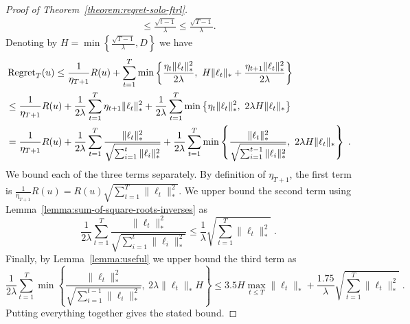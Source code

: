 \begin{proof}[Proof of Theorem~\ref{theorem:regret-solo-ftrl}]
\begin{align*}
\le \frac{\sqrt{t-1}}{\lambda}
\le \frac{\sqrt{T-1}}{\lambda}.
\end{align*}
Denoting by $H=\min\left\{\frac{\sqrt{T-1}}{\lambda},D\right\}$ we have
\begin{align*}
& \operatorname{Regret}_T(u)
\le \frac{1}{\eta_{T+1}} R(u) + \sum_{t=1}^T \min\left\{ \frac{\eta_t \|\ell_t\|_*^2}{2\lambda}, \ H \|\ell_t\|_* + \frac{\eta_{t+1} \|\ell_t\|_*^2}{2\lambda}  \right\} \\
& \le \frac{1}{\eta_{T+1}} R(u) + \frac{1}{2\lambda} \sum_{t=1}^T  \eta_{t+1} \|\ell_t\|_*^2 + \frac{1}{2\lambda} \sum_{t=1}^T \min\left\{ \eta_t \|\ell_t\|_*^2, \ 2 \lambda H \|\ell_t\|_* \right\} \\
& = \frac{1}{\eta_{T+1}} R(u) + \frac{1}{2\lambda} \sum_{t=1}^T  \frac{\|\ell_t\|_*^2}{\sqrt{\sum_{i=1}^t \|\ell_i\|_*^2}} + \frac{1}{2 \lambda} \sum_{t=1}^T \min\left\{ \frac{\|\ell_t\|_*^2}{\sqrt{\sum_{i=1}^{t-1} \|\ell_i\|_*^2}}, \ 2 \lambda H \|\ell_t\|_* \right\} \; .
\end{align*}
We bound each of the three terms separately. By definition of $\eta_{T+1}$, the
first term is $\frac{1}{\eta_{T+1}} R(u) = R(u) \sqrt{\sum_{t=1}^T
\|\ell_t\|_*^2}$.  We upper bound the second term using
Lemma~\ref{lemma:sum-of-square-roots-inverses} as
$$
\frac{1}{2\lambda} \sum_{t=1}^T  \frac{\|\ell_t\|_*^2}{\sqrt{\sum_{i=1}^t \|\ell_i\|_*^2}}
\le \frac{1}{\lambda} \sqrt{\sum_{t=1}^T \|\ell_t\|_*^2} \; .
$$
Finally, by Lemma~\ref{lemma:useful} we upper bound the third term as
$$
\frac{1}{2 \lambda} \sum_{t=1}^T \min\left\{ \frac{\|\ell_t\|_*^2}{\sqrt{\sum_{i=1}^{t-1} \|\ell_i\|_*^2}}, \ 2 \lambda \|\ell_t\|_* H \right\}
\le 3.5 H \max_{t \le T} \|\ell_t\|_* + \frac{1.75}{\lambda} \sqrt{\sum_{t=1}^T \|\ell_t\|_*^2} \; .
$$
Putting everything together gives the stated bound.
\end{proof}
